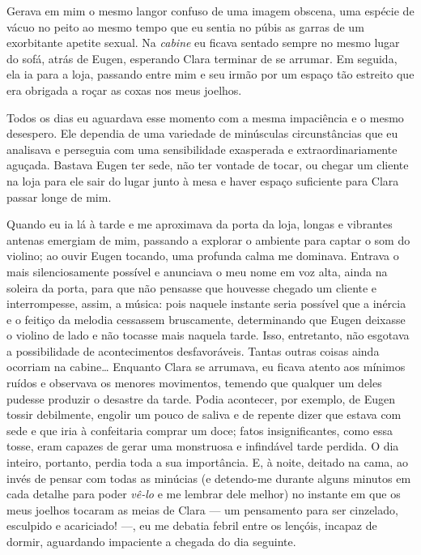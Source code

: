 Gerava em mim o mesmo langor confuso de uma imagem obscena, uma espécie de
vácuo no peito ao mesmo tempo que eu sentia no púbis as garras de um
exorbitante apetite sexual. Na \textit{cabine} eu ficava sentado sempre no
mesmo lugar do sofá, atrás de Eugen, esperando Clara terminar de se arrumar.
Em seguida, ela ia para a loja, passando entre mim e seu irmão por um espaço
tão estreito que era obrigada a roçar as coxas nos meus joelhos.

Todos os dias eu aguardava esse momento com a mesma impaciência e o mesmo
desespero. Ele dependia de uma variedade de minúsculas circunstâncias que eu
analisava e perseguia com uma sensibilidade exasperada e extraordinariamente
aguçada. Bastava Eugen ter sede, não ter vontade de tocar, ou chegar um
cliente na loja para ele sair do lugar junto à mesa e haver espaço suficiente
para Clara passar longe de mim.

Quando eu ia lá à tarde e me aproximava da porta da loja, longas e vibrantes
antenas emergiam de mim, passando a explorar o ambiente para captar o som do
violino; ao ouvir Eugen tocando, uma profunda calma me dominava. Entrava o
mais silenciosamente possível e anunciava o meu nome em voz alta, ainda na
soleira da porta, para que não pensasse que houvesse chegado um cliente e
interrompesse, assim, a música: pois naquele instante seria possível que a
inércia e o feitiço da melodia cessassem bruscamente, determinando que Eugen
deixasse o violino de lado e não tocasse mais naquela tarde. Isso,
entretanto, não esgotava a possibilidade de acontecimentos desfavoráveis.
Tantas outras coisas ainda ocorriam na cabine\ldots{} Enquanto Clara se
arrumava, eu ficava atento aos mínimos ruídos e observava os menores
movimentos, temendo que qualquer um deles pudesse produzir o desastre da
tarde. Podia acontecer, por exemplo, de Eugen tossir debilmente, engolir um
pouco de saliva e de repente dizer que estava com sede e que iria à
confeitaria comprar um doce; fatos insignificantes, como essa tosse, eram
capazes de gerar uma monstruosa e infindável tarde perdida. O dia inteiro,
portanto, perdia toda a sua importância. E, à noite, deitado na cama, ao
invés de pensar com todas as minúcias (e detendo-me durante alguns minutos em
cada detalhe para poder \textit{vê-lo} e me lembrar dele melhor) no instante
em que os meus joelhos tocaram as meias de Clara --- um pensamento para ser
cinzelado, esculpido e acariciado! ---, eu me debatia febril entre os
lençóis, incapaz de dormir, aguardando impaciente a chegada do dia seguinte.

